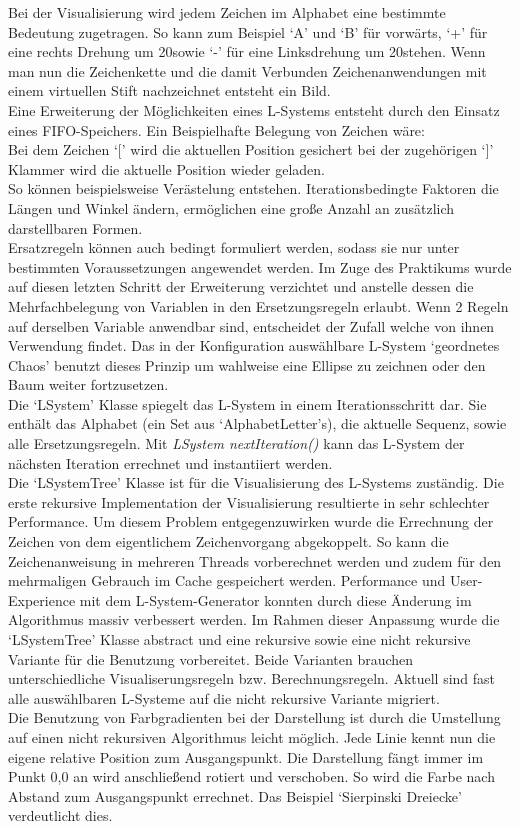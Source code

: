 \documentclass[../mciAusarbeitung.tex]{subfiles}
\begin{document}
	Bei der Visualisierung wird jedem Zeichen im Alphabet eine bestimmte Bedeutung zugetragen. So kann zum Beispiel `A' und `B' für vorwärts, `+' für eine rechts Drehung um 20\textdegree\:sowie `-' für eine Linksdrehung um 20\textdegree\:stehen. Wenn man nun die Zeichenkette und die damit Verbunden Zeichenanwendungen mit einem virtuellen Stift nachzeichnet entsteht ein Bild. \\
	Eine Erweiterung der Möglichkeiten eines L-Systems entsteht durch den Einsatz eines FIFO-Speichers. Ein Beispielhafte Belegung von Zeichen wäre:\\
	 Bei dem Zeichen `$[$' wird die aktuellen Position gesichert bei der zugehörigen `$]$' Klammer wird die aktuelle Position wieder geladen.\\
	 So können beispielsweise Verästelung entstehen. Iterationsbedingte Faktoren die Längen und Winkel ändern, ermöglichen eine große Anzahl an zusätzlich darstellbaren Formen.\\
	 Ersatzregeln können auch bedingt formuliert werden, sodass sie nur unter bestimmten Voraussetzungen angewendet werden. Im Zuge des Praktikums wurde auf diesen letzten Schritt der Erweiterung verzichtet und anstelle dessen die Mehrfachbelegung von Variablen in den Ersetzungsregeln erlaubt. Wenn 2 Regeln auf derselben Variable anwendbar sind, entscheidet der Zufall welche von ihnen Verwendung findet. Das in der Konfiguration auswählbare L-System `geordnetes Chaos' benutzt dieses Prinzip um wahlweise eine Ellipse zu zeichnen oder den Baum weiter fortzusetzen.\\
Die `LSystem' Klasse spiegelt das L-System in einem Iterationsschritt dar. Sie enthält das Alphabet (ein Set aus `AlphabetLetter's), die aktuelle Sequenz, sowie alle Ersetzungsregeln. Mit \textit{LSystem nextIteration()} kann das L-System der nächsten Iteration errechnet und instantiiert werden.\\
Die `LSystemTree' Klasse ist für die Visualisierung des L-Systems zuständig. Die erste rekursive Implementation der Visualisierung resultierte in sehr schlechter Performance. Um diesem Problem entgegenzuwirken wurde die Errechnung der Zeichen von dem eigentlichem Zeichenvorgang abgekoppelt. So kann die Zeichenanweisung in mehreren Threads vorberechnet werden und zudem für den mehrmaligen Gebrauch im Cache gespeichert werden.
 Performance und User-Experience mit dem L-System-Generator konnten durch diese Änderung im Algorithmus massiv verbessert werden. Im Rahmen dieser Anpassung wurde die `LSystemTree' Klasse abstract und eine rekursive sowie eine nicht rekursive Variante für die Benutzung vorbereitet. Beide Varianten brauchen unterschiedliche Visualiserungsregeln bzw. Berechnungsregeln. Aktuell sind fast alle auswählbaren L-Systeme auf die nicht rekursive Variante migriert.\\
	Die Benutzung von Farbgradienten bei der Darstellung ist durch die Umstellung auf einen nicht rekursiven Algorithmus leicht möglich. Jede Linie kennt nun die eigene relative Position zum Ausgangspunkt. Die Darstellung fängt immer im Punkt 0,0 an wird anschließend rotiert und verschoben. So wird die Farbe nach Abstand zum Ausgangspunkt errechnet. Das Beispiel `Sierpinski Dreiecke' verdeutlicht dies.
\end{document}

